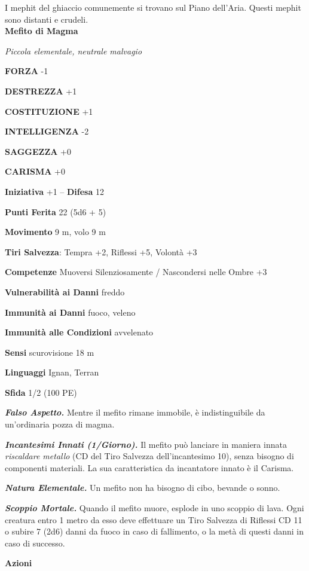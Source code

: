 \begin{multicols}{2}
I mephit del ghiaccio comunemente si trovano sul Piano dell'Aria. Questi mephit sono distanti e crudeli.\\


\medskip{}\textbf{Mefito di Magma}

\emph{Piccola elementale, neutrale malvagio}

\textbf{FORZA} -1

\textbf{DESTREZZA} +1

\textbf{COSTITUZIONE} +1

\textbf{INTELLIGENZA} -2

\textbf{SAGGEZZA} +0

\textbf{CARISMA} +0

\textbf{Iniziativa} +1 -- \textbf{Difesa} 12

\textbf{Punti Ferita} 22 (5d6 + 5)

\textbf{Movimento} 9 m, volo 9 m

\textbf{Tiri Salvezza}: Tempra +2, Riflessi +5, Volontà +3

\textbf{Competenze} Muoversi Silenziosamente / Nascondersi nelle Ombre +3

\textbf{Vulnerabilità ai Danni} freddo

\textbf{Immunità ai Danni} fuoco, veleno

\textbf{Immunità alle Condizioni} avvelenato

\textbf{Sensi} scurovisione 18 m

\textbf{Linguaggi} Ignan, Terran

\textbf{Sfida} 1/2 (100 PE)

\emph{\textbf{Falso Aspetto.}} Mentre il mefito rimane immobile, è
indistinguibile da un'ordinaria pozza di magma.

\emph{\textbf{Incantesimi Innati (1/Giorno).}} Il mefito può lanciare in
maniera innata \emph{riscaldare metallo} (CD del Tiro Salvezza
dell'incantesimo 10), senza bisogno di componenti materiali. La sua
caratteristica da incantatore innato è il Carisma.

\emph{\textbf{Natura Elementale.}} Un mefito non ha bisogno di cibo,
bevande o sonno.

\emph{\textbf{Scoppio Mortale.}} Quando il mefito muore, esplode in uno scoppio di lava. Ogni creatura entro 1 metro da esso deve effettuare un Tiro Salvezza di Riflessi CD 11 o subire 7 (2d6) danni da fuoco in caso di fallimento, o la metà di questi danni in caso di successo.

\textbf{Azioni}


\end{multicols}
